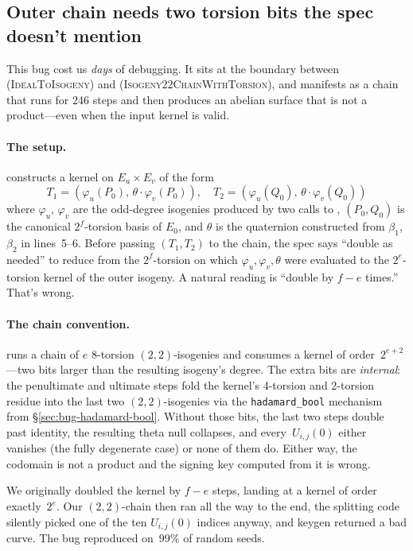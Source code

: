 \subsection{Outer chain needs two torsion bits the spec doesn't mention}
\label{sec:bug-outer-chain-extra-torsion}

This bug cost us \emph{days} of debugging.  It sits at the
boundary between  (\textsc{IdealToIsogeny}) and
 (\textsc{Isogeny22ChainWithTorsion}), and manifests as
a chain that runs for 246 steps and then produces an abelian surface
that is not a product---even when the input kernel is valid.

\paragraph{The setup.}
 constructs a kernel on $E_u \times E_v$ of the form
\[
  T_1 = (\varphi_u(P_0),\, \theta \cdot \varphi_v(P_0)),\quad
  T_2 = (\varphi_u(Q_0),\, \theta \cdot \varphi_v(Q_0))
\]
where $\varphi_u$, $\varphi_v$ are the odd-degree isogenies produced
by two calls to , $(P_0, Q_0)$ is the canonical
$2^f$-torsion basis of $E_0$, and $\theta$ is the quaternion
constructed from $\beta_1$, $\beta_2$ in lines~5--6.  Before passing
$(T_1, T_2)$ to the chain, the spec says ``double as needed'' to
reduce from the $2^f$-torsion on which $\varphi_u, \varphi_v, \theta$
were evaluated to the $2^e$-torsion kernel of the outer isogeny.  A
natural reading is ``double by $f - e$ times.''  That's wrong.

\paragraph{The chain convention.}
 runs a chain of $e$ 8-torsion $(2,2)$-isogenies and
consumes a kernel of order~$2^{e+2}$---two bits larger than the
resulting isogeny's degree.  The extra bits are \emph{internal}:
the penultimate and ultimate steps fold the kernel's 4-torsion and
2-torsion residue into the last two $(2,2)$-isogenies via the
\texttt{hadamard\_bool} mechanism from
§\ref{sec:bug-hadamard-bool}.  Without those bits, the last two
steps double past identity, the resulting theta null collapses, and
every~$U_{i,j}(0)$ either vanishes (the fully degenerate case) or
none of them do.  Either way, the codomain is not a product and
the signing key computed from it is wrong.

We originally doubled the kernel by $f - e$ steps, landing at a
kernel of order exactly~$2^e$.  Our $(2,2)$-chain then ran all the
way to the end, the splitting code silently picked one of the ten
$U_{i,j}(0)$ indices anyway, and keygen returned a bad curve.
The bug reproduced on~$99\%$ of random seeds.


